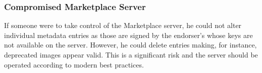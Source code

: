 \subsubsection{Compromised Marketplace Server}

If someone were to take control of the Marketplace server, he could
not alter individual metadata entries as those are signed by the
endorser's whose keys are not available on the server.  However, he
could delete entries making, for instance, deprecated images appear
valid.  This is a significant risk and the server should be operated
according to modern best practices.
